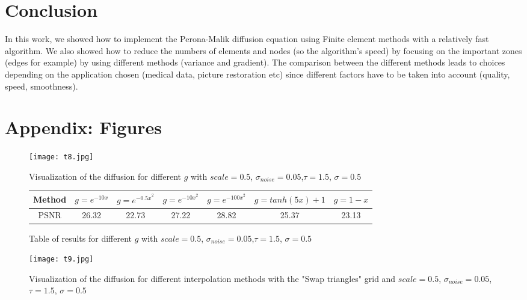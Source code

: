 \documentclass{report}
\begin{document}
\chapter*{Conclusion}

In this work, we showed how to implement the Perona-Malik diffusion equation using Finite element methods with a relatively fast algorithm. We also showed how to reduce the numbers of elements and nodes (so the algorithm's speed) by focusing on the important zones (edges for example) by using different methods (variance and gradient). The comparison between the different methods leads to choices depending on the application chosen (medical data, picture restoration etc) since different factors have to be taken into account (quality, speed, smoothness). 

\chapter*{Appendix: Figures}

        \begin{figure}
        	\label{t8}
        	\centering
        	\caption{Visualization of the diffusion for different $g$ with $scale=0.5$, $\sigma_{noise}=0.05$,$\tau=1.5$, $\sigma=0.5$ }
        	\texttt{[image: t8.jpg]}
        \end{figure}
        
        
        
        
        
        \begin{figure}[h!]
        	\centering
        	\label{T8}
        	\caption{Table of results for different $g$ with $scale=0.5$, $\sigma_{noise}=0.05$,$\tau=1.5$, $\sigma=0.5$ }
        	\begin{tabular}{|c|c|c|c|c|c|c|}
        		\hline
        		Method & $g= e^{-10 x}$ & $g= e^{-{0.5 x}^2}$ & $g= e^{-{10 x}^2}$ & $g= e^{-{100 x}^2}$ & $g= tanh(5 x)+1$ & $g= 1-x$  \\
        		\hline
        		PSNR  & 26.32 & 22.73 & 27.22 & 28.82 & 25.37 & 23.13 \\
        		\hline
        	\end{tabular}
        \end{figure}
        
        
        
        \begin{figure}
        	\centering
        	\label{t9}
        	\caption{Visualization of the diffusion for different interpolation methods with the "Swap triangles" grid and $scale=0.5$, $\sigma_{noise}=0.05$,$\tau=1.5$, $\sigma=0.5$ }
        	\texttt{[image: t9.jpg]}
        \end{figure}
\end{document}
